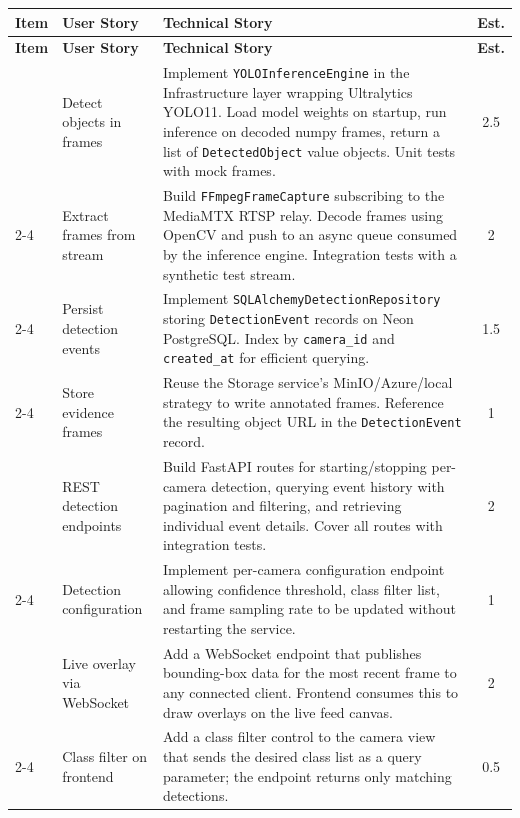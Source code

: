 \begin{sloppypar}
\begin{longtable}{|>{\small}p{2cm}|>{\small}p{4cm}|>{\small}p{5.5cm}|>{\small}c|}
\hline
\textbf{Item} & \textbf{User Story} & \textbf{Technical Story} & \textbf{Est.} \\ \hline
\endfirsthead \hline \textbf{Item} & \textbf{User Story} & \textbf{Technical Story} & \textbf{Est.} \\ \hline
\endhead \hline
\endfoot \hline
\endlastfoot

\multirow{4}{*}{\parbox{2cm}{\small Object Detection Core}} &
Detect objects in frames & Implement \texttt{YOLOInferenceEngine} in the Infrastructure layer wrapping Ultralytics YOLO11. Load model weights on startup, run inference on decoded numpy frames, return a list of \texttt{DetectedObject} value objects. Unit tests with mock frames. & 2.5 \\ \cline{2-4}
& Extract frames from stream & Build \texttt{FFmpegFrameCapture} subscribing to the MediaMTX RTSP relay. Decode frames using OpenCV and push to an async queue consumed by the inference engine. Integration tests with a synthetic test stream. & 2 \\ \cline{2-4}
& Persist detection events & Implement \texttt{SQLAlchemyDetectionRepository} storing \texttt{DetectionEvent} records on Neon PostgreSQL. Index by \texttt{camera\_id} and \texttt{created\_at} for efficient querying. & 1.5 \\ \cline{2-4}
& Store evidence frames & Reuse the Storage service's MinIO/Azure/local strategy to write annotated frames. Reference the resulting object URL in the \texttt{DetectionEvent} record. & 1 \\ \hline

\multirow{2}{*}{\parbox{2cm}{\small Detection API}} &
REST detection endpoints & Build FastAPI routes for starting/stopping per-camera detection, querying event history with pagination and filtering, and retrieving individual event details. Cover all routes with integration tests. & 2 \\ \cline{2-4}
& Detection configuration & Implement per-camera configuration endpoint allowing confidence threshold, class filter list, and frame sampling rate to be updated without restarting the service. & 1 \\ \hline

\multirow{2}{*}{\parbox{2cm}{\small Detection Display}} &
Live overlay via WebSocket & Add a WebSocket endpoint that publishes bounding-box data for the most recent frame to any connected client. Frontend consumes this to draw overlays on the live feed canvas. & 2 \\ \cline{2-4}
& Class filter on frontend & Add a class filter control to the camera view that sends the desired class list as a query parameter; the endpoint returns only matching detections. & 0.5 \\ \hline


\end{longtable}
\end{sloppypar}
